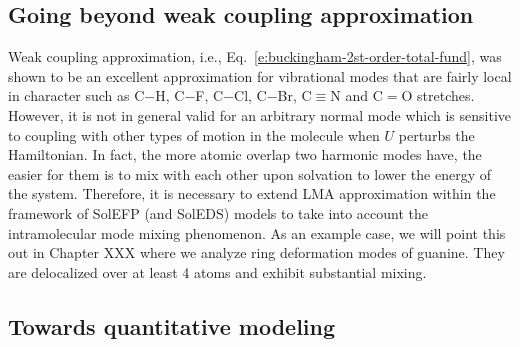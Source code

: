 \documentclass[a4paper,titlepage,twoside,fleqn,12pt]{book}
\begin{document}
\begin{refsection}
\section{Going beyond weak coupling approximation}

Weak coupling approximation, i.e., Eq.~\eqref{e:buckingham-2st-order-total-fund},
was shown to be an excellent approximation
for vibrational modes that are fairly local in character
such as C$-$H, C$-$F, C$-$Cl, C$-$Br, C$\equiv$N and C$=$O stretches. However, it
is not in general valid for an arbitrary normal mode
which is sensitive to coupling with other types of motion
in the molecule when $U$ perturbs the Hamiltonian.
In fact, the more atomic overlap two harmonic modes have,
the easier for them is to mix with each other
upon solvation to lower the energy
of the system. 
Therefore, it is necessary to extend LMA approximation
within the framework of SolEFP (and SolEDS) models
to take into account the intramolecular mode mixing
phenomenon. As an example case, we will point this out
in Chapter XXX where we analyze ring deformation modes
of guanine. They are delocalized over at least 4 atoms
and exhibit substantial mixing.

\subsection{Towards quantitative modeling}


\end{refsection}
\end{document}
